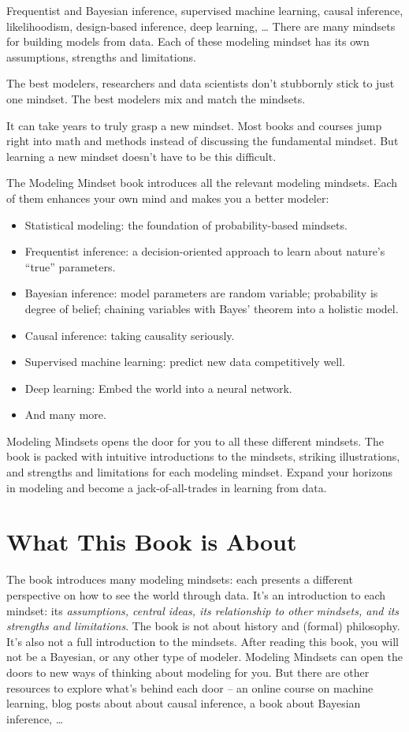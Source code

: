 \documentclass[
  10pt,
]{scrbook}
\providecommand{\tightlist}{%
  \setlength{\itemsep}{0pt}\setlength{\parskip}{0pt}}
\begin{document}
Frequentist and Bayesian inference, supervised machine learning, causal inference, likelihoodism, design-based inference, deep learning, \ldots{}
There are many mindsets for building models from data.
Each of these modeling mindset has its own assumptions, strengths and limitations.

The best modelers, researchers and data scientists don't stubbornly stick to just one mindset.
The best modelers mix and match the mindsets.

It can take years to truly grasp a new mindset.
Most books and courses jump right into math and methods instead of discussing the fundamental mindset.
But learning a new mindset doesn't have to be this difficult.

The Modeling Mindset book introduces all the relevant modeling mindsets.
Each of them enhances your own mind and makes you a better modeler:

\begin{itemize}
\tightlist
\item
  Statistical modeling: the foundation of probability-based mindsets.
\item
  Frequentist inference: a decision-oriented approach to learn about nature's ``true'' parameters.
\item
  Bayesian inference: model parameters are random variable; probability is degree of belief; chaining variables with Bayes' theorem into a holistic model.
\item
  Causal inference: taking causality seriously.
\item
  Supervised machine learning: predict new data competitively well.
\item
  Deep learning: Embed the world into a neural network.
\item
  And many more.
\end{itemize}

Modeling Mindsets opens the door for you to all these different mindsets.
The book is packed with intuitive introductions to the mindsets, striking illustrations, and strengths and limitations for each modeling mindset.
Expand your horizons in modeling and become a jack-of-all-trades in learning from data.

\hypertarget{what-this-book-is-about}{%
\chapter{What This Book is About}\label{what-this-book-is-about}}

The book introduces many modeling mindsets: each presents a different perspective on how to see the world through data.
It's an introduction to each mindset: its \emph{assumptions, central ideas, its relationship to other mindsets, and its strengths and limitations}.
The book is not about history and (formal) philosophy.
It's also not a full introduction to the mindsets.
After reading this book, you will not be a Bayesian, or any other type of modeler.
Modeling Mindsets can open the doors to new ways of thinking about modeling for you.
But there are other resources to explore what's behind each door -- an online course on machine learning, blog posts about about causal inference, a book about Bayesian inference, \ldots{}
\end{document}
